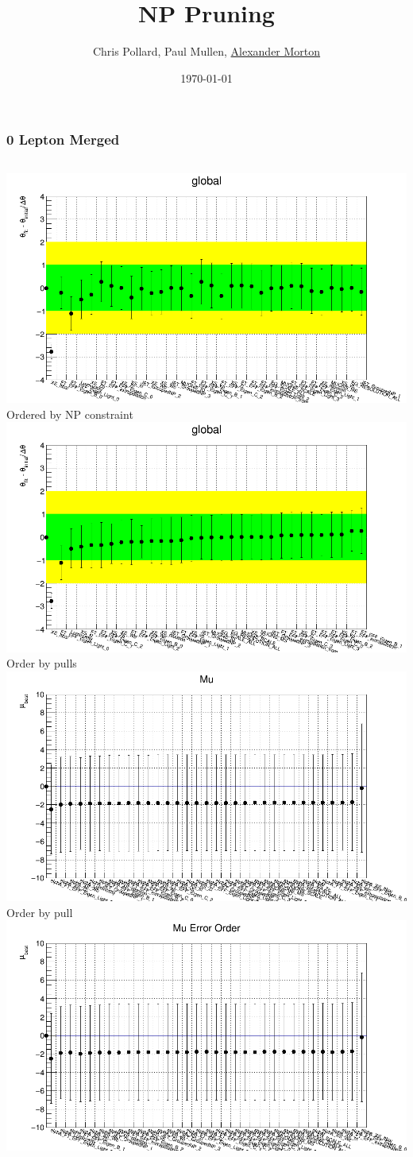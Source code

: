 \documentclass{beamer}
\title[NP Pruning]{NP Pruning}
\author{Chris Pollard, Paul Mullen, \underline{Alexander Morton}} %
\institute[Glasgow] %
{
University of Glasgow \\ %
\medskip
\textit{a.morton.2@research.com} %
}
\date{\today} %
\begin{document}
\begin{frame}
\frametitle{0 Lepton Merged}
\begin{columns}[t]
\centering
\includegraphics[width=0.8\linewidth]{pics/pull_0lep_merge_order_constraint.png}\\
\tiny{ Ordered by NP constraint }\\
\includegraphics[width=0.8\linewidth]{pics/pull_0lep_merge_order_pull.png}\\
\tiny{ Order by pulls  }\\
\centering
\includegraphics[width=0.8\linewidth]{pics/mu_0lep_merge_order_pull.png}\\
\tiny{ Order by pull }\\
\includegraphics[width=0.8\linewidth]{pics/mu_0lep_merge_order_constraint.png}\\ 

\end{columns}
\end{frame}
\end{document}
